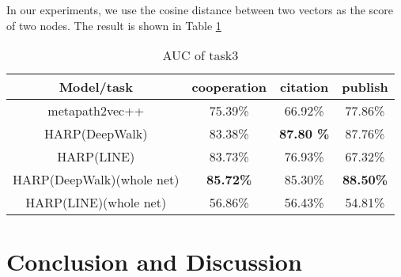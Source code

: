 \documentclass[conference]{IEEEtran}
\begin{document}
In our experiments, we use the cosine distance between two vectors as the score of two nodes. The result is shown in Table \ref{AUC}
\begin{table}[h]
\center
\begin{tabular}{c|c|c|c}
\hline
\hline
\textbf{Model/task} & \textbf{cooperation} & \textbf{citation} & \textbf{publish}\\
\hline
\hline
metapath2vec++ &75.39\%&66.92\%&77.86\%\\
\hline
HARP(DeepWalk)&83.38\%&\textbf{87.80 \%}&87.76\%\\
\hline
HARP(LINE)&83.73\%&76.93\%& 67.32\%\\
\hline
HARP(DeepWalk)(whole net)& \textbf{85.72\%}&85.30\%&\textbf{88.50\%}\\
\hline
HARP(LINE)(whole net)&56.86\%&56.43\%& 54.81\%\\
\hline
\hline
\end{tabular}
\caption{AUC of task3}
\label{AUC}
\end{table}
\section{Conclusion and Discussion}


\end{document}
